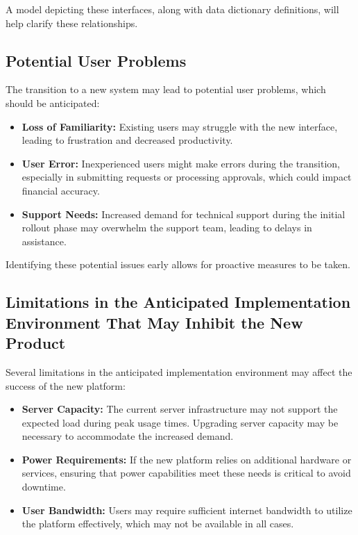\documentclass[12pt]{article}
\begin{document}
A model depicting these interfaces, along with data dictionary definitions, will help clarify these relationships.

\subsection{Potential User Problems}
The transition to a new system may lead to potential user problems, which should be anticipated:

\begin{itemize}
    \item \textbf{Loss of Familiarity:} Existing users may struggle with the new interface, leading to frustration and decreased productivity.
    \item \textbf{User Error:} Inexperienced users might make errors during the transition, especially in submitting requests or processing approvals, which could impact financial accuracy.
    \item \textbf{Support Needs:} Increased demand for technical support during the initial rollout phase may overwhelm the support team, leading to delays in assistance.
\end{itemize}

Identifying these potential issues early allows for proactive measures to be taken.

\subsection{Limitations in the Anticipated Implementation Environment That May Inhibit the New Product}
Several limitations in the anticipated implementation environment may affect the success of the new platform:

\begin{itemize}
    \item \textbf{Server Capacity:} The current server infrastructure may not support the expected load during peak usage times. Upgrading server capacity may be necessary to accommodate the increased demand.
    \item \textbf{Power Requirements:} If the new platform relies on additional hardware or services, ensuring that power capabilities meet these needs is critical to avoid downtime.
    \item \textbf{User Bandwidth:} Users may require sufficient internet bandwidth to utilize the platform effectively, which may not be available in all cases.
\end{itemize}
\end{document}
